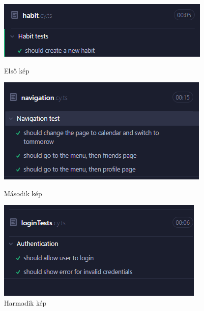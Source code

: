 \documentclass[12pt]{report}
\begin{document}
\begin{figure}[H]
    \centering
    \begin{minipage}[b]{0.3\textwidth}
        \centering
        \includegraphics[width=\linewidth]{src/habittest.png}
        \caption{Első kép}
        \label{fig:img1}
    \end{minipage}
    \hspace{0.03\textwidth}
    \begin{minipage}[b]{0.3\textwidth}
        \centering
        \includegraphics[width=\linewidth]{src/navigationtest.png}
        \caption{Második kép}
        \label{fig:img2}
    \end{minipage}
    \hspace{0.03\textwidth}
    \begin{minipage}[b]{0.3\textwidth}
        \centering
        \includegraphics[width=\linewidth]{src/logintest.png}
        \caption{Harmadik kép}
        \label{fig:img3}
    \end{minipage}
\end{figure}
\end{document}
